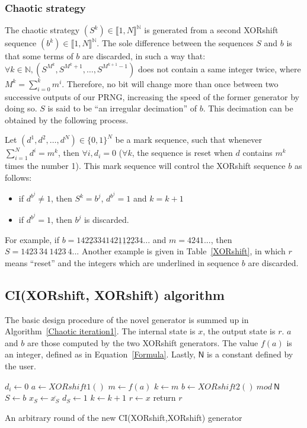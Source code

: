\documentclass[10pt, a4paper, conference, compsocconf]{IEEEtran}
\begin{document}
\subsubsection{Chaotic strategy}
\label{Chaotic strategy}
The chaotic strategy $(S^k) \in \llbracket 1, N \rrbracket^\mathds{N}$ is generated from a second XORshift sequence $(b^k) \in \llbracket 1, N \rrbracket^\mathds{N}$. The sole difference between the sequences $S$ and $b$ is that some terms of $b$ are discarded, in such a way that: $\forall k \in \mathds{N}, (S^{M^k}, S^{M^k+1}, \hdots, S^{M^{k+1}-1})$ does not contain a same integer twice, where $M^k = \sum_{i=0}^k m^i$. Therefore, no bit will change more than once between two successive outputs of our PRNG, increasing the speed of the former generator by doing so. $S$ is said to be ``an irregular decimation'' of $b$. This decimation can be obtained by the following process.

Let $(d^1,d^2,\dots,d^N)\in \{0,1\}^N$ be a mark sequence, such that whenever $\sum_{i=1}^N d^i = m^k$, 
then $\forall i, d_i=0$ ($\forall k$, the sequence is reset when $d$ contains $m^k$ times the number 1). This mark sequence will control the XORshift sequence $b$ as follows:
\begin{itemize}
\item if $d^{b^j} \neq 1$, then $S^k=b^j$, $d^{b^j} = 1$ and $k = k+1$
\item if $d^{b^j}=1$, then $b^j$ is discarded.
\end{itemize}
For example, if $b = 142\underline{2}334 142\underline{1}\underline{1}\underline{2}\underline{2}34...$ and $m = 4241...$, then $S=1423~34~1423~4...$ Another example is given in Table~\ref{XORshift}, in which $r$ means ``reset'' and the integers which are underlined in sequence $b$ are discarded.


\subsection{CI(XORshift, XORshift) algorithm}
The basic design procedure of the novel generator is summed up in Algorithm~\ref{Chaotic iteration1}.
The internal state is $x$, the output state is $r$. $a$ and $b$ are those computed by the two XORshift 
generators. The value $f(a)$ is an integer, defined as in Equation~\ref{Formula}. Lastly, $\mathsf{N}$ is a constant defined by the user.
\begin{algorithm}
\SetAlgoLined
{}
{
$d_i\leftarrow{0}$\;
}
$a\leftarrow{XORshift1()}$\;
$m\leftarrow{f(a)}$\;
$k\leftarrow{m}$\;
{
$b\leftarrow{XORshift2()~mod~\mathsf{N}}$\;
$S\leftarrow{b}$\;
    {
      $x_S\leftarrow{ \overline{x_S}}$\;
      $d_S\leftarrow{1}$\;
    }
    {
      $k\leftarrow{ k+1}$\;
    }
}
$r\leftarrow{x}$\;
return $r$\;
\medskip
\caption{An arbitrary round of the new CI(XORshift,XORshift) generator}
\label{Chaotic iteration1}
\end{algorithm}
\end{document}
